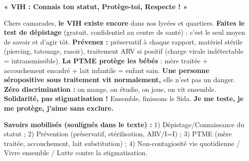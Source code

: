\documentclass[11pt]{article}
\newcounter{popsec}
\newcounter{popsub}
\newcommand{\courssub}[1]{%
  \stepcounter{popsub}%
  \par\vspace{9pt}\noindent{\popxbold\fontsize{11.5}{13}\selectfont\color{popink}{\color{poporange}\thepopsec.\thepopsub}\hspace{6pt}#1}\par\nopagebreak\vspace{4pt}
}
\begin{document}
\begin{corrige}
\begin{exemplebox}
\textbf{« VIH : Connais ton statut, Protège-toi, Respecte ! »}

Chers camarades, \textbf{le VIH existe encore} dans nos lycées et quartiers. \textbf{Faites le test de dépistage} (gratuit, confidentiel au centre de santé) : c'est le seul moyen de savoir et d'agir tôt. \textbf{Prévenez :} préservatif à chaque rapport, matériel stérile (piercing, tatouage, rasoir), traitement ARV si positif (charge virale indétectable = intransmissible). \textbf{La PTME protège les bébés} : mère traitée + accouchement encadré + lait infantile = enfant sain. \textbf{Une personne séropositive sous traitement vit normalement,} elle n'est pas un danger. \textbf{Zéro discrimination :} on mange, on étudie, on joue, on vit ensemble. \textbf{Solidarité, pas stigmatisation !} Ensemble, finissons le Sida. \textbf{Je me teste, je me protège, j'aime sans exclure.}
\end{exemplebox}
\textbf{Savoirs mobilisés (soulignés dans le texte) :} 1) Dépistage/Connaissance du statut ; 2) Prévention (préservatif, stérilisation, ARV/I=I) ; 3) PTME (mère traitée, accouchement, lait substitution) ; 4) Non-contagiosité vie quotidienne / Vivre ensemble / Lutte contre la stigmatisation.
\end{corrige}

\courssub{Je me prépare au Bac}
\end{document}
